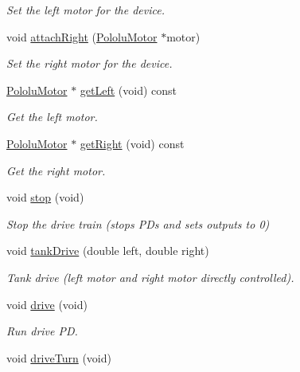 \begin{DoxyCompactItemize}
\begin{DoxyCompactList}\small\item\em Set the left motor for the device. \end{DoxyCompactList}\item 
void \hyperlink{class_drive_train_aae42a38cca31408dc00a10b45b667da6}{attach\+Right} (\hyperlink{class_pololu_motor}{Pololu\+Motor} $\ast$motor)
\begin{DoxyCompactList}\small\item\em Set the right motor for the device. \end{DoxyCompactList}\item 
\hyperlink{class_pololu_motor}{Pololu\+Motor} $\ast$ \hyperlink{class_drive_train_acc0d2f2280bfacea903df5d77ee1c5e0}{get\+Left} (void) const
\begin{DoxyCompactList}\small\item\em Get the left motor. \end{DoxyCompactList}\item 
\hyperlink{class_pololu_motor}{Pololu\+Motor} $\ast$ \hyperlink{class_drive_train_a9f2a7ed0d2d2b91319a09083a37d236a}{get\+Right} (void) const
\begin{DoxyCompactList}\small\item\em Get the right motor. \end{DoxyCompactList}\item 
void \hyperlink{class_drive_train_a18d4c7b82118a1da8910d09a31f88a38}{stop} (void)
\begin{DoxyCompactList}\small\item\em Stop the drive train (stops P\+Ds and sets outputs to 0) \end{DoxyCompactList}\item 
void \hyperlink{class_drive_train_a60ef155b4f149532a2ae872edc0e2cc2}{tank\+Drive} (double left, double right)
\begin{DoxyCompactList}\small\item\em Tank drive (left motor and right motor directly controlled). \end{DoxyCompactList}\item 
void \hyperlink{class_drive_train_a53087c84c085d1f06b06d2e191e34882}{drive} (void)
\begin{DoxyCompactList}\small\item\em Run drive PD. \end{DoxyCompactList}\item 
void \hyperlink{class_drive_train_af7e515735f07964fdf42e79bf822e3d1}{drive\+Turn} (void)

\end{DoxyCompactItemize}
